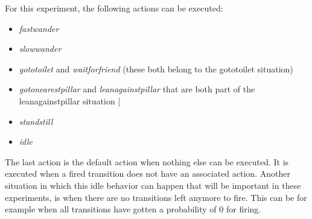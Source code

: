 \documentclass[11pt]{book}
\begin{document}
For this experiment, the following actions can be executed:
\begin{itemize}
\item \emph{fastwander}
\item \emph{slowwander}
\item \emph{gototoilet} and \emph{waitforfriend} (these both belong to the gototoilet situation)
\item \emph{gotonearestpillar} and \emph{leanagainstpillar} that are both part of the leanagainstpillar situation |
\item \emph{standstill}
\item \emph{idle}
\end{itemize}
The last action is the default action when nothing else can be executed. It is executed when a fired transition does not have an associated action. Another situation in which this idle behavior can happen that will be important in these experiments, is when there are no transitions left anymore to fire. This can be for example when all transitions have gotten a probability of 0 for firing.

\end{document}
